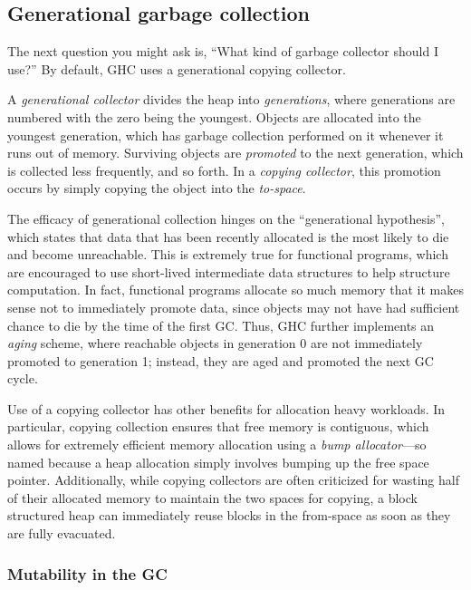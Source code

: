 \subsection{Generational garbage collection}

The next question you might ask is, ``What kind of garbage collector
should I use?''  By default, GHC uses a generational copying collector.

A \emph{generational collector} divides the heap into
\emph{generations}, where generations are numbered with the zero being
the youngest.  Objects are allocated into the youngest generation, which
has garbage collection performed on it whenever it runs out of memory.
Surviving objects are \emph{promoted} to the next generation, which is
collected less frequently, and so forth.  In a \emph{copying collector}, this
promotion occurs by simply copying the object into the \emph{to-space}.

The efficacy of generational collection hinges on the ``generational
hypothesis'', which states that data that has been recently allocated is
the most likely to die and become unreachable.  This is extremely true
for functional programs, which are encouraged to use short-lived
intermediate data structures to help structure computation.  In fact,
functional programs allocate so much memory that it makes sense not to
immediately promote data, since objects may not have had sufficient
chance to die by the time of the first GC.  Thus, GHC further implements
an \emph{aging} scheme, where reachable objects in generation 0 are not
immediately promoted to generation 1; instead, they are aged and
promoted the next GC cycle.

Use of a copying collector has other benefits for allocation heavy
workloads.  In particular, copying collection ensures that free memory
is contiguous, which allows for extremely efficient memory allocation
using a \emph{bump allocator}---so named because a heap allocation
simply involves bumping up the free space pointer. Additionally, while
copying collectors are often criticized for wasting half of their
allocated memory to maintain the two spaces for copying, a block
structured heap can immediately reuse blocks in the from-space as soon
as they are fully evacuated. 

\subsubsection{Mutability in the GC}

